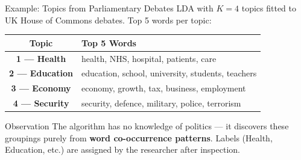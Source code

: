 \documentclass[aspectratio=169]{beamer}
\begin{document}
\begin{frame}{Example: Topics from Parliamentary Debates}
    \small
    {\footnotesize LDA with \(K=4\) topics fitted to UK House of Commons debates. Top 5 words per topic:}

    \vspace{0.2cm}
    \begin{tabular}{@{}cl@{}}
        \toprule
        \textbf{Topic} & \textbf{Top 5 Words} \\
        \midrule
        \textbf{\color{sgsssMagenta} 1 --- Health} & health, NHS, hospital, patients, care \\[0.15cm]
        \textbf{\color{sgsssGreen} 2 --- Education} & education, school, university, students, teachers \\[0.15cm]
        \textbf{\color{sgsssBlack} 3 --- Economy} & economy, growth, tax, business, employment \\[0.15cm]
        \textbf{\color{sgsssMagenta!60!sgsssBlack} 4 --- Security} & security, defence, military, police, terrorism \\
        \bottomrule
    \end{tabular}

    \vspace{0.3cm}
    \begin{exampleblock}{Observation}
        \footnotesize
        The algorithm has no knowledge of politics --- it discovers these groupings purely from \textbf{word co-occurrence patterns}.
        Labels (Health, Education, etc.) are assigned by the researcher after inspection.
    \end{exampleblock}
\end{frame}
\end{document}
